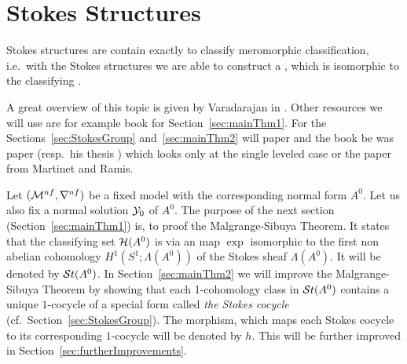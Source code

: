 \chapter{Stokes Structures}\label{chap:stokes}
Stokes structures are contain exactly  to
classify meromorphic classification, i.e.\ with the Stokes structures we are
able to construct a , which is isomorphic to
the classifying .

A great overview of this topic is given by Varadarajan in
\cite{Varadarajan96linearmeromorphic}. Other resources we will use are for
example  book \cite[section II]{sabbah2007isomonodromic} for
Section~\ref{sec:mainThm1}.
For the Sections~\ref{sec:StokesGroup} and~\ref{sec:mainThm2} will
 paper \cite{Loday1994} and the book
\cite[Sec.4]{Loday2014} be  was 
paper \cite{boalch} (resp.\ his thesis \cite{thboalch}) which looks only at the
single leveled case or the paper \cite[Thm.13]{Martinet1991} from Martinet and
Ramis.

Let $(\mathcal{M}^{nf},\nabla^{nf})$ be a fixed model with the corresponding normal
form $A^0$.
Let us also fix a normal solution $\mathcal{Y}_0$ of $A^0$.
The purpose of the next section (Section~\ref{sec:mainThm1}) is, to proof the
Malgrange-Sibuya Theorem.
It states that the classifying set $\mathcal{H}(A^0)$ is via an map $\exp$ isomorphic
to the first non abelian cohomology $H^1(S^1;\Lambda(A^0))$ of the Stokes sheaf
$\Lambda(A^0)$. It will be denoted by $\mathcal{S}{}t(A^0)$.
In Section~\ref{sec:mainThm2} we will improve the Malgrange-Sibuya Theorem by
showing that each 1-cohomology class in $\mathcal{S}{}t(A^0)$ contains a unique
$1$-cocycle of a special form called \emph{the Stokes cocycle}
(cf.\ Section~\ref{sec:StokesGroup}).
The morphism, which maps each Stokes cocycle to its corresponding $1$-cocycle
will be denoted by $h$.
This will be further improved in Section~\ref{sec:furtherImprovements}.

